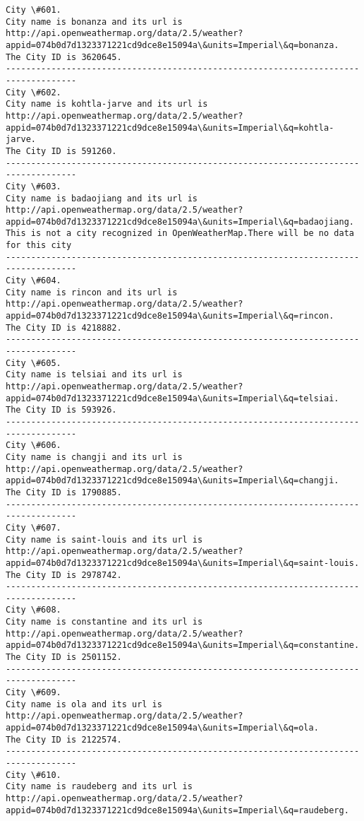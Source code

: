 \documentclass[11pt]{article}
\begin{document}
\begin{Verbatim}[commandchars=\\\{\}]
City \#601.
City name is bonanza and its url is http://api.openweathermap.org/data/2.5/weather?appid=074b0d7d1323371221cd9dce8e15094a\&units=Imperial\&q=bonanza.
The City ID is 3620645.
------------------------------------------------------------------------------------
City \#602.
City name is kohtla-jarve and its url is http://api.openweathermap.org/data/2.5/weather?appid=074b0d7d1323371221cd9dce8e15094a\&units=Imperial\&q=kohtla-jarve.
The City ID is 591260.
------------------------------------------------------------------------------------
City \#603.
City name is badaojiang and its url is http://api.openweathermap.org/data/2.5/weather?appid=074b0d7d1323371221cd9dce8e15094a\&units=Imperial\&q=badaojiang.
This is not a city recognized in OpenWeatherMap.There will be no data for this city
------------------------------------------------------------------------------------
City \#604.
City name is rincon and its url is http://api.openweathermap.org/data/2.5/weather?appid=074b0d7d1323371221cd9dce8e15094a\&units=Imperial\&q=rincon.
The City ID is 4218882.
------------------------------------------------------------------------------------
City \#605.
City name is telsiai and its url is http://api.openweathermap.org/data/2.5/weather?appid=074b0d7d1323371221cd9dce8e15094a\&units=Imperial\&q=telsiai.
The City ID is 593926.
------------------------------------------------------------------------------------
City \#606.
City name is changji and its url is http://api.openweathermap.org/data/2.5/weather?appid=074b0d7d1323371221cd9dce8e15094a\&units=Imperial\&q=changji.
The City ID is 1790885.
------------------------------------------------------------------------------------
City \#607.
City name is saint-louis and its url is http://api.openweathermap.org/data/2.5/weather?appid=074b0d7d1323371221cd9dce8e15094a\&units=Imperial\&q=saint-louis.
The City ID is 2978742.
------------------------------------------------------------------------------------
City \#608.
City name is constantine and its url is http://api.openweathermap.org/data/2.5/weather?appid=074b0d7d1323371221cd9dce8e15094a\&units=Imperial\&q=constantine.
The City ID is 2501152.
------------------------------------------------------------------------------------
City \#609.
City name is ola and its url is http://api.openweathermap.org/data/2.5/weather?appid=074b0d7d1323371221cd9dce8e15094a\&units=Imperial\&q=ola.
The City ID is 2122574.
------------------------------------------------------------------------------------
City \#610.
City name is raudeberg and its url is http://api.openweathermap.org/data/2.5/weather?appid=074b0d7d1323371221cd9dce8e15094a\&units=Imperial\&q=raudeberg.

\end{Verbatim}
\end{document}
